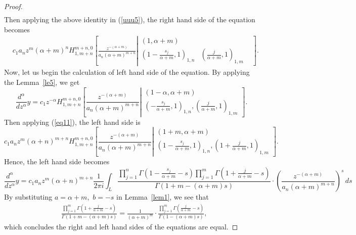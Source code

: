\documentclass[10pt,a4paper]{amsart}
\begin{document}
\begin{proof}
\begin{align*}
\end{align*}
Then applying the above identity in (\ref{uuu5}), the right hand side of the equation becomes
\begin{align*}
& c_1a_nz^m(\alpha+m)^n H_{1,m+n}^{m+n,0} \left[ \frac{z^{-(\alpha+m)}}{a_n(\alpha+m)^{m+n}} \left| \begin{matrix}
( 1 , \alpha+m )  \\
 ( 1-\frac{s_j}{\alpha+m} , 1 )_{1,n} & (\frac{j}{\alpha+m} , 1  )_{1,m} &  \end{matrix}\right.\right]. 
\end{align*}
Now, let us begin the calculation of left hand side of the equation. By applying the Lemma~\ref{le5}, we get
\begin{equation*}
 \frac{d^{\alpha}}{dz^{\alpha}}y=c_1z^{-\alpha}H_{1,m+n}^{m+n,0} \left[ \frac{z^{-(\alpha+m)}}{a_n(\alpha+m)^{m+n}} \left| \begin{matrix}
( 1-\alpha , \alpha+m )\\( -\frac{s_j}{\alpha+m} , 1 )_{1,n}, (\frac{j}{\alpha+m} , 1  )_{1,m}  \end{matrix}\right.\right].   
\end{equation*}
Then applying (\ref{eq11}),  the left hand side is
$$c_1a_nz^m(\alpha+n)^{m+n}H_{1,m+n}^{m+n,0} \left[ \frac{z^{-(\alpha+m)}}{a_n(\alpha+m)^{m+n}} \left| \begin{matrix}
( 1+m , \alpha+m )\\( 1-\frac{s_j}{\alpha+m} , 1 )_{1,n}, (1+\frac{j}{\alpha+m} , 1  )_{1,m}  \end{matrix}\right.\right].$$
Hence, the left hand side becomes
\begin{equation*}
\frac{d^{\alpha}}{dz^{\alpha}}y=
c_1a_nz^m(\alpha+n)^{m+n}\frac{1}{2\pi i}\int_{L}{\frac{\prod\limits_{j=1}^n\Gamma\left( 1-\frac{s_j}{\alpha+m}-s\right)\prod\limits_{j=1}^{m} \Gamma\left(1+\frac{j}{\alpha+m}-s\right)}{\Gamma\left(1+m-(\alpha+m)s\right)}\cdot\left(\frac{z^{-(\alpha+m)}}{a_n(\alpha+m)^{m+n}}\right)^{s}\,d} s
\end{equation*}
By substituting $a=\alpha+m,$ $b=-s$ in Lemma~\ref{lem1}, we see that
\begin{align*}
&\frac{\prod\limits_{j=1}^{m} \Gamma\left(1+\frac{j}{\alpha+m}-s\right)}{\Gamma(1+m-(\alpha+m)s)}= \frac{1}{(\alpha+m)^m}\cdot\frac{\prod\limits_{j=1}^{m}\Gamma\left(\frac{j}{\alpha+m}-s\right)}{\Gamma(1-(\alpha+m)s)},
\end{align*}
which concludes the right and left hand sides of the equations are equal.


\end{proof}
\end{document}
